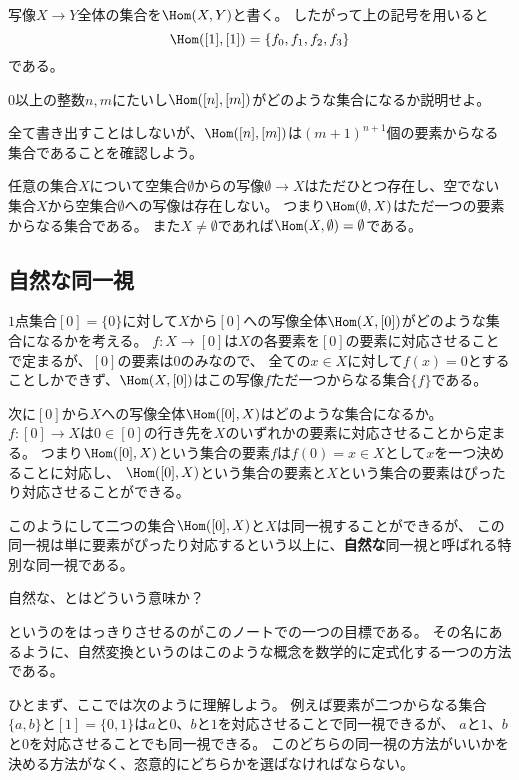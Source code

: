\documentclass[uplatex]{jsarticle}
\begin{document}
写像$X\to Y$全体の集合を$\Hom(X,Y)$と書く。
したがって上の記号を用いると
\[
\Hom([1],[1])=\{f_0,f_1,f_2,f_3\}
\]
である。

\begin{prob}
$0$以上の整数$n, m$にたいし$\Hom([n],[m])$がどのような集合になるか説明せよ。
\end{prob}
全て書き出すことはしないが、$\Hom([n],[m])$は$(m+1)^{n+1}$個の要素からなる集合であることを確認しよう。

任意の集合$X$について空集合$\emptyset$からの写像$\emptyset\to X$はただひとつ存在し、空でない集合$X$から空集合$\emptyset$への写像は存在しない。
つまり$\Hom(\emptyset,X)$はただ一つの要素からなる集合である。
また$X\neq\emptyset$であれば$\Hom(X,\emptyset)=\emptyset$である。

\subsection{自然な同一視}
$1$点集合$[0]=\{0\}$に対して$X$から$[0]$への写像全体$\Hom(X,[0])$がどのような集合になるかを考える。
$f:X \to [0]$は$X$の各要素を$[0]$の要素に対応させることで定まるが、$[0]$の要素は$0$のみなので、
全ての$x \in X$に対して$f(x)=0$とすることしかできず、$\Hom(X,[0])$はこの写像$f$ただ一つからなる集合$\{f\}$である。

\vspace{10pt}

次に$[0]$から$X$への写像全体$\Hom([0],X)$はどのような集合になるか。
$f:[0] \to X$は$0 \in [0]$の行き先を$X$のいずれかの要素に対応させることから定まる。
つまり$\Hom([0],X)$という集合の要素$f$は$f(0) = x \in X$として$x$を一つ決めることに対応し、
$\Hom([0],X)$という集合の要素と$X$という集合の要素はぴったり対応させることができる。

このようにして二つの集合$\Hom([0],X)$と$X$は同一視することができるが、
この同一視は単に要素がぴったり対応するという以上に、\textbf{自然な}同一視と呼ばれる特別な同一視である。

\begin{center}
自然な、とはどういう意味か？
\end{center}
というのをはっきりさせるのがこのノートでの一つの目標である。
その名にあるように、自然変換というのはこのような概念を数学的に定式化する一つの方法である。

\vspace{10pt}

ひとまず、ここでは次のように理解しよう。
例えば要素が二つからなる集合$\{a,b\}$と$[1]=\{0,1\}$は$a$と$0$、$b$と$1$を対応させることで同一視できるが、
$a$と$1$、$b$と$0$を対応させることでも同一視できる。
このどちらの同一視の方法がいいかを決める方法がなく、恣意的にどちらかを選ばなければならない。
\end{document}
